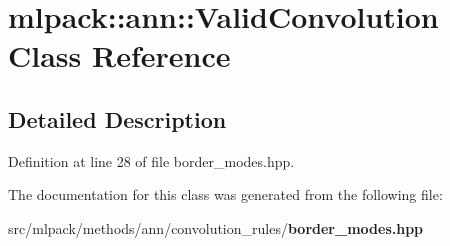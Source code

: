 \section{mlpack\+:\+:ann\+:\+:Valid\+Convolution Class Reference}
\label{classmlpack_1_1ann_1_1ValidConvolution}


\subsection{Detailed Description}


Definition at line 28 of file border\+\_\+modes.\+hpp.



The documentation for this class was generated from the following file\+:\begin{DoxyCompactItemize}
\item 
src/mlpack/methods/ann/convolution\+\_\+rules/{\bf border\+\_\+modes.\+hpp}\end{DoxyCompactItemize}
